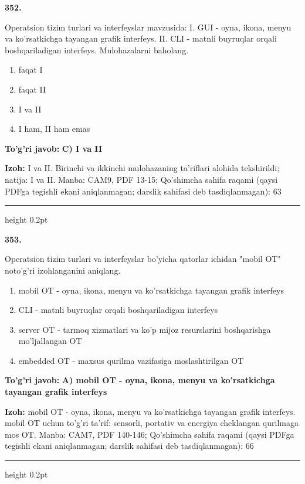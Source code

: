 \documentclass[10pt,a4paper]{article}
\begin{document}
{\bfseries\sffamily\color{ink} 352.}
\par
Operatsion tizim turlari va interfeyslar mavzusida: I. GUI - oyna, ikona, menyu va ko'rsatkichga tayangan grafik interfeys. II. CLI - matnli buyruqlar orqali boshqariladigan interfeys. Mulohazalarni baholang.
\begin{enumerate}[label=\Alph*),leftmargin=9mm]
\item faqat I
\item faqat II
\item I va II
\item I ham, II ham emas
\end{enumerate}
\begin{tcolorbox}[enhanced,breakable,colback=teal!4,colframe=teal!60!black,boxrule=0.45pt,arc=1.2mm,left=2.7mm,right=2.7mm,top=1.8mm,bottom=1.8mm,before skip=2mm,after skip=2mm]
{\bfseries\sffamily\color{teal}To'g'ri javob:} \textbf{C) I va II}
\par\smallskip
{\bfseries Izoh:} I va II. Birinchi va ikkinchi mulohazaning ta'riflari alohida tekshirildi; natija: I va II. Manba: CAM9, PDF 13-15; Qo'shimcha sahifa raqami (qaysi PDFga tegishli ekani aniqlanmagan; darslik sahifasi deb tasdiqlanmagan): 63
\end{tcolorbox}
\vspace{2mm}\hrule height 0.2pt\vspace{3mm}

{\bfseries\sffamily\color{ink} 353.}
\par
Operatsion tizim turlari va interfeyslar bo'yicha qatorlar ichidan "mobil OT" noto'g'ri izohlanganini aniqlang.
\begin{enumerate}[label=\Alph*),leftmargin=9mm]
\item mobil OT - oyna, ikona, menyu va ko'rsatkichga tayangan grafik interfeys
\item CLI - matnli buyruqlar orqali boshqariladigan interfeys
\item server OT - tarmoq xizmatlari va ko'p mijoz resurslarini boshqarishga mo'ljallangan OT
\item embedded OT - maxsus qurilma vazifasiga moslashtirilgan OT
\end{enumerate}
\begin{tcolorbox}[enhanced,breakable,colback=teal!4,colframe=teal!60!black,boxrule=0.45pt,arc=1.2mm,left=2.7mm,right=2.7mm,top=1.8mm,bottom=1.8mm,before skip=2mm,after skip=2mm]
{\bfseries\sffamily\color{teal}To'g'ri javob:} \textbf{A) mobil OT - oyna, ikona, menyu va ko'rsatkichga tayangan grafik interfeys}
\par\smallskip
{\bfseries Izoh:} mobil OT - oyna, ikona, menyu va ko'rsatkichga tayangan grafik interfeys. mobil OT uchun to'g'ri ta'rif: sensorli, portativ va energiya cheklangan qurilmaga mos OT. Manba: CAM7, PDF 140-146; Qo'shimcha sahifa raqami (qaysi PDFga tegishli ekani aniqlanmagan; darslik sahifasi deb tasdiqlanmagan): 66
\end{tcolorbox}
\vspace{2mm}\hrule height 0.2pt\vspace{3mm}
\end{document}
